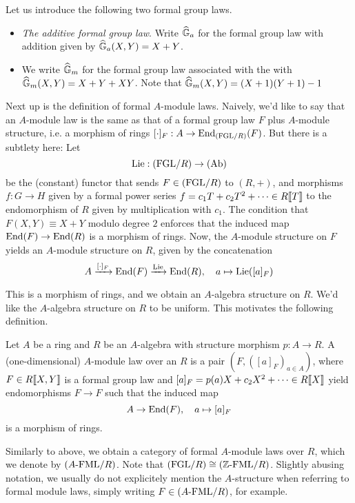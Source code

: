 \begin{xpl} Let us introduce the following two formal group laws.
  \begin{itemize}
    \item \textit{The additive formal group law}. Write 
      $\widehat{\mathbb{G}}_a$ for the formal group law with addition given by 
      $\widehat{\mathbb{G}}_a(X,Y) = X + Y$. 
    \item We write $\widehat{\mathbb{G}}_m$ for the formal group law associated with the 
      with $\widehat{\mathbb{G}}_m(X,Y) = X + Y + XY$. Note that $\widehat{\mathbb{G}}_m(X,Y) = (X+1)(Y+1) - 1$
  \end{itemize}
\end{xpl}

Next up is the definition of formal $A$-module laws. Naively, we'd like to say
that an $A$-module law is the same as that of a formal group law $F$
plus $A$-module structure, i.e. a morphism of rings $[\cdot]_F: A \to
\operatorname{End}_{(\mathrm{FGL}/{R})}(F)$. But there is a subtlety here: Let 
\begin{equation*}
  \operatorname{Lie}: {(\mathrm{FGL}/{R})} \to {(\mathrm{Ab})} 
\end{equation*}
be the (constant) functor that sends $F \in {(\mathrm{FGL}/{R})}$ to $(R,+)$, and morphisms
$f: G \to H$ given by a formal power series
$f = c_1 T + c_2 T^2 + \dots \in R\llbracket T \rrbracket$ to the endomorphism
of $R$ given by multiplication with $c_1$. The condition that 
$F(X,Y) \equiv X+Y$ modulo degree $2$ enforces that the induced map
$\operatorname{End}(F) \to \operatorname{End}(R)$ is a morphism of rings. Now, the $A$-module structure on $F$ 
yields an $A$-module structure on $R$, given by the concatenation\begin{equation*}
  A \xrightarrow{[\cdot]_F} \operatorname{End}(F) \xrightarrow{\operatorname{Lie}} \operatorname{End}(R), \quad a \mapsto \operatorname{Lie}([a]_F)
\end{equation*}

This is a morphism of rings, and we obtain an $A$-algebra structure on $R$. We'd
like the $A$-algebra structure on $R$ to be uniform. This
motivates the following definition.
\begin{defi}
  Let $A$ be a ring and $R$ be an $A$-algebra with structure
  morphism $p: A \to R$. A (one-dimensional) $A$-module law over an $R$ is a
  pair $(F, ([a]_F)_{a \in A})$, where $F \in R\llbracket X,Y \rrbracket$ is 
  a formal group law and $[a]_F = p(a)X + c_2X^2 + \dots 
  \in R\llbracket X \rrbracket$ yield endomorphisms $F \to F$ such that the induced map
  \begin{equation*}
    A \to \operatorname{End}(F), \quad a \mapsto [a]_F 
  \end{equation*}
  is a morphism of rings.
\end{defi}
Similarly to above, we obtain a category of formal $A$-module laws over $R$,
which we denote by ${({A}\text-\mathrm{FML}/{R})}$. Note that ${(\mathrm{FGL}/{R})} \cong {({\mathbb{Z}}\text-\mathrm{FML}/{R})}$.
Slightly abusing notation, we usually do not explicitely mention the $A$-structure
when referring to formal module laws, simply writing $F \in {({A}\text-\mathrm{FML}/{R})}$, for
example. 

